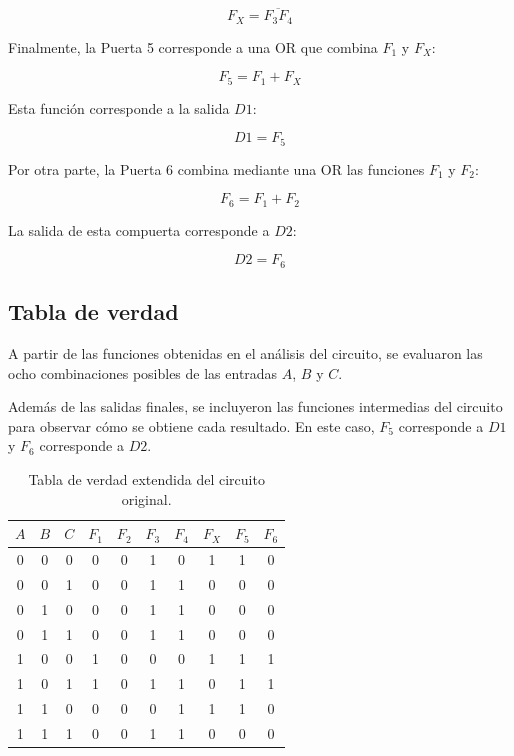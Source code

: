 \documentclass[12pt]{report}
\begin{document}
\begin{equation}
    F_X = \overline{F_3F_4}
\end{equation}

Finalmente, la Puerta 5 corresponde a una OR que combina $F_1$ y $F_X$:

\begin{equation}
    F_5 = F_1 + F_X
\end{equation}

Esta función corresponde a la salida $D1$:

\begin{equation}
    D1 = F_5
\end{equation}

Por otra parte, la Puerta 6 combina mediante una OR las funciones $F_1$ y $F_2$:

\begin{equation}
    F_6 = F_1 + F_2
\end{equation}

La salida de esta compuerta corresponde a $D2$:

\begin{equation}
    D2 = F_6
\end{equation}


\subsection{Tabla de verdad}

A partir de las funciones obtenidas en el análisis del circuito, se evaluaron las
ocho combinaciones posibles de las entradas $A$, $B$ y $C$.

Además de las salidas finales, se incluyeron las funciones intermedias del circuito
para observar cómo se obtiene cada resultado. En este caso, $F_5$ corresponde a
$D1$ y $F_6$ corresponde a $D2$.

\begin{table}[H]
    \centering
    \caption{Tabla de verdad extendida del circuito original.}
    \label{tab:tabla-verdad-extendida}
    \begin{tabular}{ccc|ccccccc}
        \toprule
        $A$ & $B$ & $C$ &
        $F_1$ & $F_2$ & $F_3$ & $F_4$ & $F_X$ & $F_5$ & $F_6$ \\
        \midrule
        0 & 0 & 0 & 0 & 0 & 1 & 0 & 1 & 1 & 0 \\
        0 & 0 & 1 & 0 & 0 & 1 & 1 & 0 & 0 & 0 \\
        0 & 1 & 0 & 0 & 0 & 1 & 1 & 0 & 0 & 0 \\
        0 & 1 & 1 & 0 & 0 & 1 & 1 & 0 & 0 & 0 \\
        1 & 0 & 0 & 1 & 0 & 0 & 0 & 1 & 1 & 1 \\
        1 & 0 & 1 & 1 & 0 & 1 & 1 & 0 & 1 & 1 \\
        1 & 1 & 0 & 0 & 0 & 0 & 1 & 1 & 1 & 0 \\
        1 & 1 & 1 & 0 & 0 & 1 & 1 & 0 & 0 & 0 \\
        \bottomrule
    \end{tabular}
\end{table}
\end{document}
